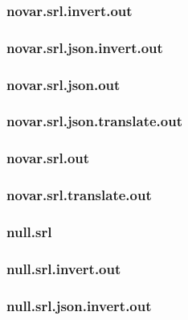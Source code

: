 \subsubsection{novar.srl.invert.out}
\label{app:novar_srl.invert.out}

\subsubsection{novar.srl.json.invert.out}
\label{app:novar_srl.json.invert.out}

\subsubsection{novar.srl.json.out}
\label{app:novar_srl.json.out}

\subsubsection{novar.srl.json.translate.out}
\label{app:novar_srl.json.translate.out}

\subsubsection{novar.srl.out}
\label{app:novar_srl.out}

\subsubsection{novar.srl.translate.out}
\label{app:novar_srl.translate.out}

\subsubsection{null.srl}
\label{app:null_srl}

\subsubsection{null.srl.invert.out}
\label{app:null_srl.invert.out}

\subsubsection{null.srl.json.invert.out}
\label{app:null_srl.json.invert.out}

